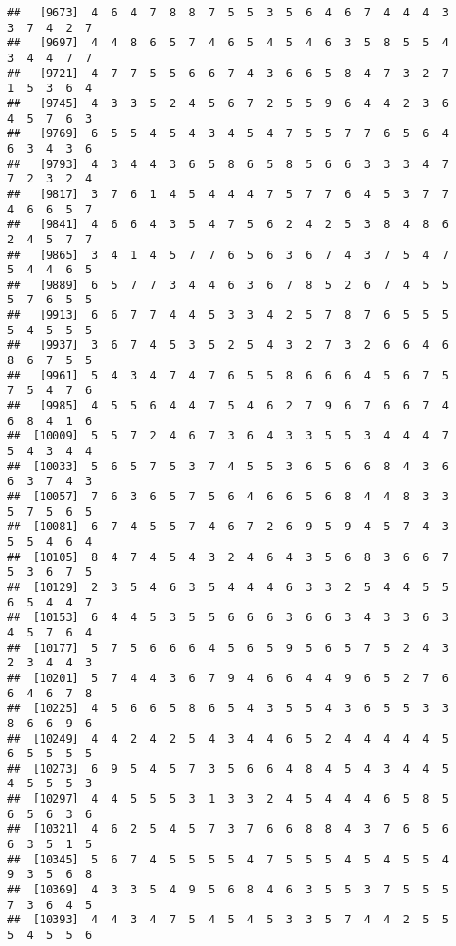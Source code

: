 \documentclass[
]{book}
\begin{document}
\begin{verbatim}
##   [9673]  4  6  4  7  8  8  7  5  5  3  5  6  4  6  7  4  4  4  3  3  7  4  2  7
##   [9697]  4  4  8  6  5  7  4  6  5  4  5  4  6  3  5  8  5  5  4  3  4  4  7  7
##   [9721]  4  7  7  5  5  6  6  7  4  3  6  6  5  8  4  7  3  2  7  1  5  3  6  4
##   [9745]  4  3  3  5  2  4  5  6  7  2  5  5  9  6  4  4  2  3  6  4  5  7  6  3
##   [9769]  6  5  5  4  5  4  3  4  5  4  7  5  5  7  7  6  5  6  4  6  3  4  3  6
##   [9793]  4  3  4  4  3  6  5  8  6  5  8  5  6  6  3  3  3  4  7  7  2  3  2  4
##   [9817]  3  7  6  1  4  5  4  4  4  7  5  7  7  6  4  5  3  7  7  4  6  6  5  7
##   [9841]  4  6  6  4  3  5  4  7  5  6  2  4  2  5  3  8  4  8  6  2  4  5  7  7
##   [9865]  3  4  1  4  5  7  7  6  5  6  3  6  7  4  3  7  5  4  7  5  4  4  6  5
##   [9889]  6  5  7  7  3  4  4  6  3  6  7  8  5  2  6  7  4  5  5  5  7  6  5  5
##   [9913]  6  6  7  7  4  4  5  3  3  4  2  5  7  8  7  6  5  5  5  5  4  5  5  5
##   [9937]  3  6  7  4  5  3  5  2  5  4  3  2  7  3  2  6  6  4  6  8  6  7  5  5
##   [9961]  5  4  3  4  7  4  7  6  5  5  8  6  6  6  4  5  6  7  5  7  5  4  7  6
##   [9985]  4  5  5  6  4  4  7  5  4  6  2  7  9  6  7  6  6  7  4  6  8  4  1  6
##  [10009]  5  5  7  2  4  6  7  3  6  4  3  3  5  5  3  4  4  4  7  5  4  3  4  4
##  [10033]  5  6  5  7  5  3  7  4  5  5  3  6  5  6  6  8  4  3  6  6  3  7  4  3
##  [10057]  7  6  3  6  5  7  5  6  4  6  6  5  6  8  4  4  8  3  3  5  7  5  6  5
##  [10081]  6  7  4  5  5  7  4  6  7  2  6  9  5  9  4  5  7  4  3  5  5  4  6  4
##  [10105]  8  4  7  4  5  4  3  2  4  6  4  3  5  6  8  3  6  6  7  5  3  6  7  5
##  [10129]  2  3  5  4  6  3  5  4  4  4  6  3  3  2  5  4  4  5  5  6  5  4  4  7
##  [10153]  6  4  4  5  3  5  5  6  6  6  3  6  6  3  4  3  3  6  3  4  5  7  6  4
##  [10177]  5  7  5  6  6  6  4  5  6  5  9  5  6  5  7  5  2  4  3  2  3  4  4  3
##  [10201]  5  7  4  4  3  6  7  9  4  6  6  4  4  9  6  5  2  7  6  6  4  6  7  8
##  [10225]  4  5  6  6  5  8  6  5  4  3  5  5  4  3  6  5  5  3  3  8  6  6  9  6
##  [10249]  4  4  2  4  2  5  4  3  4  4  6  5  2  4  4  4  4  4  5  6  5  5  5  5
##  [10273]  6  9  5  4  5  7  3  5  6  6  4  8  4  5  4  3  4  4  5  4  5  5  5  3
##  [10297]  4  4  5  5  5  3  1  3  3  2  4  5  4  4  4  6  5  8  5  6  5  6  3  6
##  [10321]  4  6  2  5  4  5  7  3  7  6  6  8  8  4  3  7  6  5  6  6  3  5  1  5
##  [10345]  5  6  7  4  5  5  5  5  4  7  5  5  5  4  5  4  5  5  4  9  3  5  6  8
##  [10369]  4  3  3  5  4  9  5  6  8  4  6  3  5  5  3  7  5  5  5  7  3  6  4  5
##  [10393]  4  4  3  4  7  5  4  5  4  5  3  3  5  7  4  4  2  5  5  5  4  5  5  6

\end{verbatim}
\end{document}
